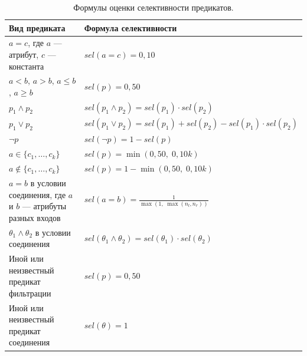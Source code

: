 \documentclass[14pt, russian]{scrartcl}
\begin{document}
\begin{table}[H]
  \centering
  \caption{Формулы оценки селективности предикатов.}
  \label{tbl:selectivity-model}
  \small
  \begin{tabular}{|p{}|p{}|}
    \hline
    Вид предиката & Формула селективности \\
    \hline
    \(a = c\), где \(a\) --- атрибут, \(c\) --- константа
      & \(sel(a = c) = 0{,}10\) \\
    \hline
    \(a < b\), \(a > b\), \(a \le b\), \(a \ge b\)
      & \(sel(p) = 0{,}50\) \\
    \hline
    \(p_1 \land p_2\)
      & \(sel(p_1 \land p_2) = sel(p_1) \cdot sel(p_2)\) \\
    \hline
    \(p_1 \lor p_2\)
      & \(sel(p_1 \lor p_2) =
         sel(p_1) + sel(p_2) - sel(p_1) \cdot sel(p_2)\) \\
    \hline
    \(\lnot p\)
      & \(sel(\lnot p) = 1 - sel(p)\) \\
    \hline
    \(a \in \{c_1, \ldots, c_k\}\)
      & \(sel(p) = \min(0{,}50,\; 0{,}10k)\) \\
    \hline
    \(a \notin \{c_1, \ldots, c_k\}\)
      & \(sel(p) = 1 - \min(0{,}50,\; 0{,}10k)\) \\
    \hline
    \(a = b\) в условии соединения, где \(a\) и \(b\) --- атрибуты разных входов
      & \(sel(a = b) = \frac{1}{\max(1,\; \max(n_l, n_r))}\) \\
    \hline
    \(\theta_1 \land \theta_2\) в условии соединения
      & \(sel(\theta_1 \land \theta_2) =
         sel(\theta_1) \cdot sel(\theta_2)\) \\
    \hline
    Иной или неизвестный предикат фильтрации
      & \(sel(p) = 0{,}50\) \\
    \hline
    Иной или неизвестный предикат соединения
      & \(sel(\theta) = 1\) \\
    \hline
  \end{tabular}
\end{table}
\end{document}
